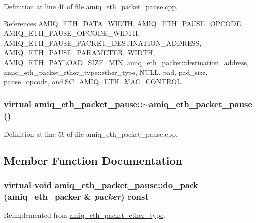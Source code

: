 Definition at line 46 of file amiq\_\-eth\_\-packet\_\-pause.cpp.

References AMIQ\_\-ETH\_\-DATA\_\-WIDTH, AMIQ\_\-ETH\_\-PAUSE\_\-OPCODE, AMIQ\_\-ETH\_\-PAUSE\_\-OPCODE\_\-WIDTH, AMIQ\_\-ETH\_\-PAUSE\_\-PACKET\_\-DESTINATION\_\-ADDRESS, AMIQ\_\-ETH\_\-PAUSE\_\-PARAMETER\_\-WIDTH, AMIQ\_\-ETH\_\-PAYLOAD\_\-SIZE\_\-MIN, amiq\_\-eth\_\-packet::destination\_\-address, amiq\_\-eth\_\-packet\_\-ether\_\-type::ether\_\-type, NULL, pad, pad\_\-size, pause\_\-opcode, and SC\_\-AMIQ\_\-ETH\_\-MAC\_\-CONTROL.\hypertarget{classamiq__eth__packet__pause_abe069c9121e346b2fbbc5aa693ab6a8d}{
\subsubsection[{$\sim$amiq\_\-eth\_\-packet\_\-pause}]{\setlength{\rightskip}{0pt plus 5cm}virtual amiq\_\-eth\_\-packet\_\-pause::$\sim$amiq\_\-eth\_\-packet\_\-pause ()}}
\label{classamiq__eth__packet__pause_abe069c9121e346b2fbbc5aa693ab6a8d}


Definition at line 59 of file amiq\_\-eth\_\-packet\_\-pause.cpp.

\subsection{Member Function Documentation}
\hypertarget{classamiq__eth__packet__pause_aaea61c8cafc5274eac5d2b5428876868}{
\subsubsection[{do\_\-pack}]{\setlength{\rightskip}{0pt plus 5cm}virtual void amiq\_\-eth\_\-packet\_\-pause::do\_\-pack ({\bf amiq\_\-eth\_\-packer} \& {\em packer}) const}}
\label{classamiq__eth__packet__pause_aaea61c8cafc5274eac5d2b5428876868}


Reimplemented from \hyperlink{classamiq__eth__packet__ether__type_a62fe5f26a466f0bd0045599b89aa6926}{amiq\_\-eth\_\-packet\_\-ether\_\-type}.

